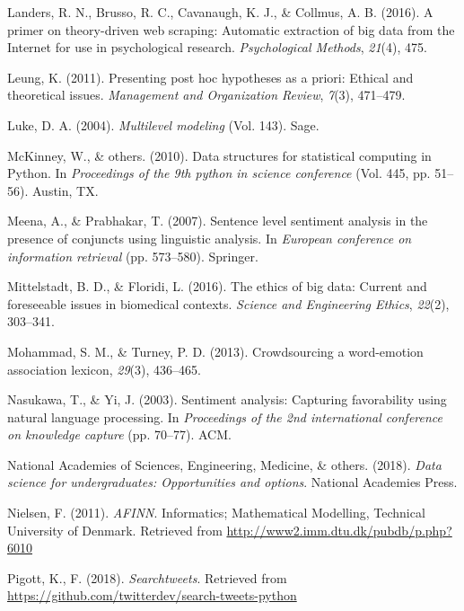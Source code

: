 \documentclass[12pt,twoside]{reedthesis}
\begin{document}
\hypertarget{ref-landers2016primer}{}
Landers, R. N., Brusso, R. C., Cavanaugh, K. J., \& Collmus, A. B.
(2016). A primer on theory-driven web scraping: Automatic extraction of
big data from the Internet for use in psychological research.
\emph{Psychological Methods}, \emph{21}(4), 475.

\hypertarget{ref-leung2011presenting}{}
Leung, K. (2011). Presenting post hoc hypotheses as a priori: Ethical
and theoretical issues. \emph{Management and Organization Review},
\emph{7}(3), 471--479.

\hypertarget{ref-luke2004multilevel}{}
Luke, D. A. (2004). \emph{Multilevel modeling} (Vol. 143). Sage.

\hypertarget{ref-mckinney2010data}{}
McKinney, W., \& others. (2010). Data structures for statistical
computing in Python. In \emph{Proceedings of the 9th python in science
conference} (Vol. 445, pp. 51--56). Austin, TX.

\hypertarget{ref-meena2007sentence}{}
Meena, A., \& Prabhakar, T. (2007). Sentence level sentiment analysis in
the presence of conjuncts using linguistic analysis. In \emph{European
conference on information retrieval} (pp. 573--580). Springer.

\hypertarget{ref-mittelstadt2016ethics}{}
Mittelstadt, B. D., \& Floridi, L. (2016). The ethics of big data:
Current and foreseeable issues in biomedical contexts. \emph{Science and
Engineering Ethics}, \emph{22}(2), 303--341.

\hypertarget{ref-Mohammad13}{}
Mohammad, S. M., \& Turney, P. D. (2013). Crowdsourcing a word-emotion
association lexicon, \emph{29}(3), 436--465.

\hypertarget{ref-nasukawa2003sentiment}{}
Nasukawa, T., \& Yi, J. (2003). Sentiment analysis: Capturing
favorability using natural language processing. In \emph{Proceedings of
the 2nd international conference on knowledge capture} (pp. 70--77).
ACM.

\hypertarget{ref-national2018data}{}
National Academies of Sciences, Engineering, Medicine, \& others.
(2018). \emph{Data science for undergraduates: Opportunities and
options}. National Academies Press.

\hypertarget{ref-afinn}{}
Nielsen, F. (2011). \emph{AFINN}. Informatics; Mathematical Modelling,
Technical University of Denmark. Retrieved from
\url{http://www2.imm.dtu.dk/pubdb/p.php?6010}

\hypertarget{ref-searchtweets}{}
Pigott, K., F. (2018). \emph{Searchtweets}. Retrieved from
\url{https://github.com/twitterdev/search-tweets-python}
\end{document}
